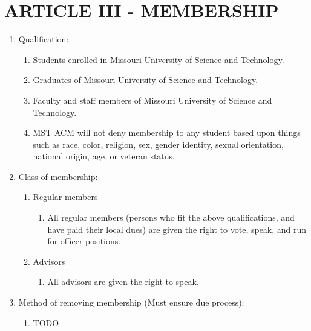 \documentclass[11pt,a4paper,notitlepage]{article}
\begin{document}
\section*{ARTICLE III - MEMBERSHIP}
\begin{enumerate}[label=\Alph*.]
  \item Qualification:
    \begin{enumerate}[label=\arabic*.]
      \item Students enrolled in Missouri University of Science and Technology.
      \item Graduates of Missouri University of Science and Technology.
      \item Faculty and staff members of Missouri University of Science and Technology.
      \item MST ACM will not deny membership to any student based upon things such as race, color, religion, sex, gender identity, sexual orientation, national origin, age, or veteran status.
    \end{enumerate}
  \item Class of membership:
    \begin{enumerate}[label=\arabic*.]
      \item Regular members
        \begin{enumerate}[label=\alph*.]
          \item All regular members (persons who fit the above qualifications, and have paid their local dues) are given the right to vote, speak, and run for officer positions.
        \end{enumerate}
      \item Advisors
        \begin{enumerate}[label=\alph*.]
          \item All advisors are given the right to speak.
        \end{enumerate}
    \end{enumerate}
  \item Method of removing membership (Must ensure due process):
    \begin{enumerate}[label=\arabic*.]
      \item TODO
    \end{enumerate}
\end{enumerate}



\end{document}
